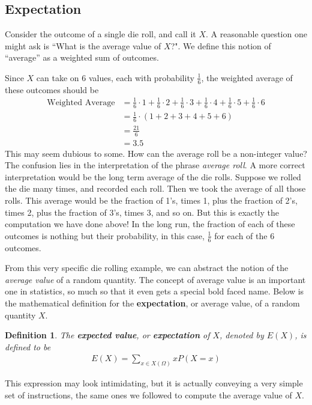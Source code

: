 \documentclass[11pt,letterpaper]{article}
\numberwithin{theorem}{section}
\newtheorem{definition}[theorem]{Definition}
\numberwithin{definition}{section}
\numberwithin{lemma}{section}
\numberwithin{corollary}{section}
\numberwithin{proposition}{section}
\theoremstyle{definition}
\numberwithin{remark}{section}
\numberwithin{claim}{section}
\numberwithin{observation}{section}
\numberwithin{fact}{section}
\numberwithin{assumption}{section}
\numberwithin{example}{section}
\numberwithin{exercise}{section}
\begin{document}
\newpage 

\subsection{Expectation}
Consider the outcome of a single die roll, and call it $X$. A reasonable question one might ask is ``What is the average value of $X$?". We define this notion of ``average'' as a weighted sum of outcomes. 

Since $X$ can take on 6 values, each with probability $\frac{1}{6}$, the weighted average of these outcomes should be
\begin{align*}
\text{Weighted Average} &= \frac{1}{6} \cdot 1 + \frac{1}{6} \cdot 2 + \frac{1}{6} \cdot 3 + \frac{1}{6} \cdot 4 + \frac{1}{6} \cdot 5 + \frac{1}{6} \cdot 6 \\
&= \frac{1}{6} \cdot (1 + 2 + 3 + 4 + 5 + 6) \\
&= \frac{21}{6} \\
&= 3.5
\end{align*}
This may seem dubious to some. How can the average roll be a non-integer value? The confusion lies in the interpretation of the phrase \textit{average roll}. A more correct interpretation would be the long term average of the die rolls. Suppose we rolled the die many times, and recorded each roll. Then we took the average of all those rolls. This average would be the fraction of 1's, times 1, plus the fraction of 2's, times 2, plus the fraction of 3's, times 3, and so on. But this is exactly the computation we have done above! In the long run, the fraction of each of these outcomes is nothing but their probability, in this case, $\frac{1}{6}$ for each of the 6 outcomes.

From this very specific die rolling example, we can abstract the notion of the \textit{average value} of a random quantity. The concept of average value is an important one in statistics, so much so that it even gets a special bold faced name. Below is the mathematical definition for the \textbf{expectation}, or average value, of a random quantity $X$.

\begin{definition}
The \textbf{expected value}, or \textbf{expectation} of $X$, denoted by $E(X)$, is defined to be
\begin{align*}
E(X) = \sum_{x \in X(\Omega)}  x P(X = x)
\end{align*}
\end{definition}
This expression may look intimidating, but it is actually conveying a very simple set of instructions, the same ones we followed to compute the average value of $X$.
\end{document}
